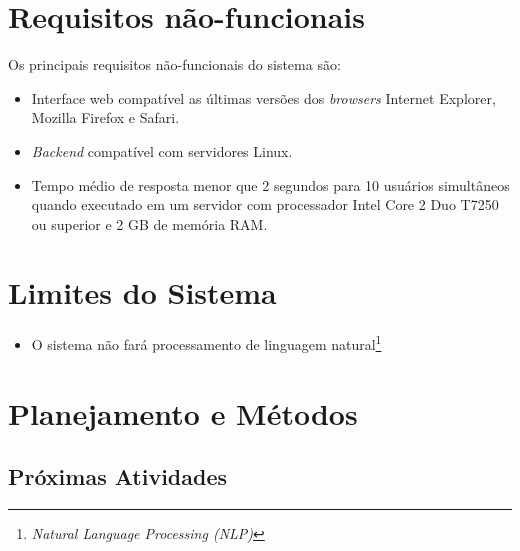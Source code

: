 \section{Requisitos não-funcionais}

Os principais requisitos não-funcionais do sistema são:

\begin{itemize}

    \item Interface web compatível as últimas versões dos \textit{browsers} Internet Explorer, Mozilla Firefox e Safari.
    
    \item \textit{Backend} compatível com servidores Linux.

    \item Tempo médio de resposta menor que 2 segundos para 10 usuários simultâneos quando executado em um servidor com processador Intel Core 2 Duo T7250 ou superior e 2 GB de memória RAM. %

\end{itemize}

\section{Limites do Sistema}

\begin{itemize}
  
    \item O sistema não fará processamento de linguagem natural\footnote{\textit{Natural Language Processing (NLP)}}

\end{itemize}



\section{Planejamento e Métodos} %
\label{sec:planejamento_e_métodos}

\subsection{Próximas Atividades} %
\label{sub:próximas_atividades}

